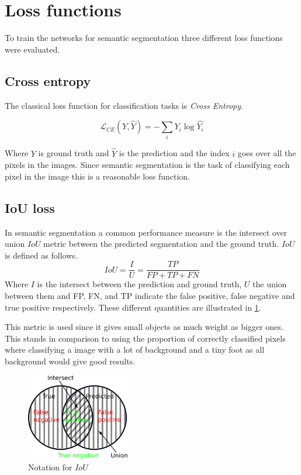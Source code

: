 \documentclass{kththesis}
\begin{document}
\section{Loss functions}
To train the networks for semantic segmentation three different loss functions
were evaluated.

\subsection{Cross entropy}\label{section:cross_entropy}
The classical loss function for classification tasks is
\textit{Cross Entropy}.

\[\mathcal{L}_{CE}(Y, \hat{Y}) =- \sum_i Y_i \log\hat{Y_i}\]

Where \(Y\) is ground truth and \(\hat{Y}\) is the prediction and the index
\(i\) goes over all the pixels in the images. Since
semantic segmentation is the task of classifying each pixel in the image this is
a reasonable loss function.

\subsection{IoU loss}
In semantic segmentation a common performance measure is the intersect over union
\(IoU\) metric between the predicted segmentation and the ground truth.
\(IoU\) is defined as follows.
\[IoU = \frac{I}{U} = \frac{\textit{TP}}{\textit{FP} + \textit{TP} + \textit{FN}}\]
Where \(I\) is the intersect between the prediction and ground truth, \(U\) the union
between them and FP, FN, and TP indicate the false positive, false negative and
true positive respectively. These different quantities are illustrated in \cref{fig:IoU}.

This metric is used since it gives small objects as much weight as bigger ones.
This stands in comparison to using the proportion of correctly classified pixels
where classifying a image with a lot of background and a tiny foot as all background
would give good results.

\begin{figure}[h]
  \centering
  \includegraphics[width=0.40\textwidth]{IoU}
  \caption{Notation for \(IoU\)}
  \label{fig:IoU}
\end{figure}
\end{document}

